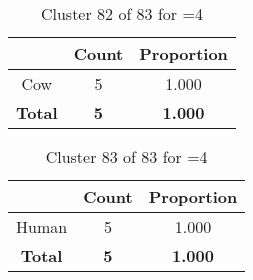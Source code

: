 \begin{table}[ht!]
\centering
\begin{tabular}{|c|c|c|}
\hline
\bf \Spec{} &\bf Count &\bf Proportion\\ \hline \hline
Cow & 5 & 1.000\\ \hline
\hline
\bf Total & \bf 5 & \bf 1.000\\ \hline
\end{tabular}
\label{tab:cluster:82:4}
\caption{Cluster 82 of 83 for \minneigh{}=4}
\end{table}

\begin{table}[ht!]
\centering
\begin{tabular}{|c|c|c|}
\hline
\bf \Spec{} &\bf Count &\bf Proportion\\ \hline \hline
Human & 5 & 1.000\\ \hline
\hline
\bf Total & \bf 5 & \bf 1.000\\ \hline
\end{tabular}
\label{tab:cluster:83:4}
\caption{Cluster 83 of 83 for \minneigh{}=4}
\end{table}

